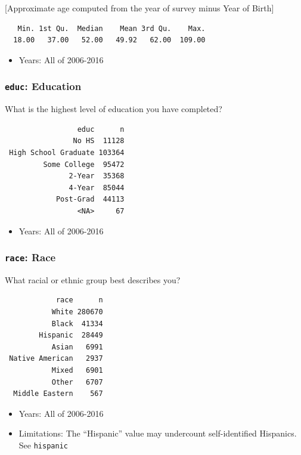 \documentclass[10pt,article,oneside]{memoir}
\theoremstyle{definition}
\begin{document}
{[}Approximate age computed from the year of survey minus Year of
Birth{]}

\begin{verbatim}
   Min. 1st Qu.  Median    Mean 3rd Qu.    Max. 
  18.00   37.00   52.00   49.92   62.00  109.00 
\end{verbatim}

\begin{itemize}
\tightlist
\item
  Years: All of 2006-2016
\end{itemize}

\subsubsection{\texorpdfstring{\texttt{educ}:
Education}{educ: Education}}\label{educ-education}

What is the highest level of education you have completed?

\begin{verbatim}
                 educ      n
                No HS  11128
 High School Graduate 103364
         Some College  95472
               2-Year  35368
               4-Year  85044
            Post-Grad  44113
                 <NA>     67
\end{verbatim}

\begin{itemize}
\tightlist
\item
  Years: All of 2006-2016
\end{itemize}

\subsubsection{\texorpdfstring{\texttt{race}:
Race}{race: Race}}\label{race-race}

What racial or ethnic group best describes you?

\begin{verbatim}
            race      n
           White 280670
           Black  41334
        Hispanic  28449
           Asian   6991
 Native American   2937
           Mixed   6901
           Other   6707
  Middle Eastern    567
\end{verbatim}

\begin{itemize}
\tightlist
\item
  Years: All of 2006-2016
\item
  Limitations: The ``Hispanic'' value may undercount self-identified
  Hispanics. See \texttt{hispanic}
\end{itemize}
\end{document}
